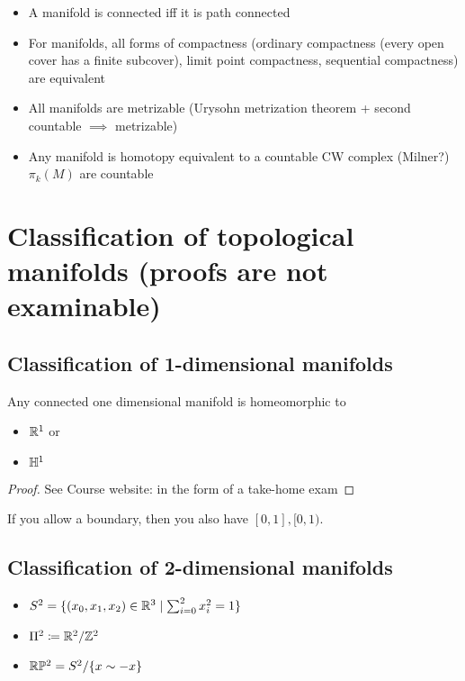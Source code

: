 
\begin{itemize}
    \item A manifold is connected iff it is path connected 
    \item For manifolds, all forms of compactness (ordinary compactness (every open cover has a finite subcover), limit point compactness, sequential compactness) are equivalent
    \item All manifolds are metrizable (Urysohn metrization theorem + second countable \(\implies\) metrizable) 
    \item Any manifold is homotopy equivalent to a countable CW complex (Milner?) \(\pi_k(M)\) are countable
\end{itemize}

\section{Classification of topological manifolds (proofs are not examinable)}
\subsection{Classification of 1-dimensional manifolds}
\begin{theorem}\label{thm:1.9}
    Any connected one dimensional manifold is homeomorphic to  
    \begin{itemize}
        \item \(\mathbb{R}^1\) or
        \item \(\mathbb{H}^1\)
    \end{itemize}
\end{theorem}

\begin{proof}
    See Course website: \cite{gale_classification_takehome} in the form of a take-home exam
\end{proof}

\begin{remark}
    If you allow a boundary, then you also have \([0,1],[0,1)\). 
\end{remark}

\subsection{Classification of 2-dimensional manifolds}
\begin{itemize}
    \item \(S^2=\{(x_0,x_1,x_2)\in\mathbb{R}^3\mid \sum_{i=0}^2 x_i^2=1\}\)
    \item \(\Pi^2 \coloneqq \mathbb{R}^2/\mathbb{Z}^2\)
    \item \(\mathbb{R}\mathbb{P}^2=S^2/\{x\sim -x\}\)
\end{itemize}

